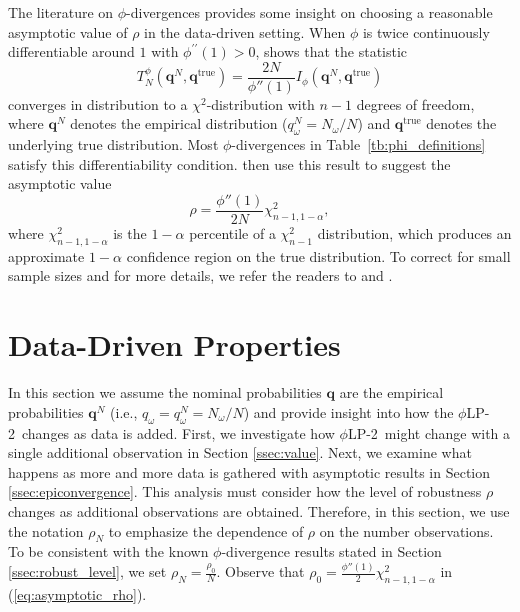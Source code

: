 \documentclass[opre,nonblindrev]{informs3} %
\newcommand{\q}{\mathbf{q}}
\newcommand{\qtrue}{\q^{\text{true}}}
\newcommand{\plp}{$\phi$LP-2}
\begin{document}
The literature on $\phi$-divergences provides some insight on choosing a reasonable asymptotic value of $\rho$ in the data-driven setting. 
When $\phi$ is twice continuously differentiable around $1$ with $\phi^{\prime \prime}(1)>0$, \citet[Theorem 3.1]{pardo2005statistical} shows that the statistic
\[
	T^\phi_N(\q^N,\qtrue) = \frac{2N}{\phi''(1)} I_{\phi}(\q^N, \qtrue)
\]
converges in distribution to a $\chi^2$-distribution with $n-1$ degrees of freedom, where $\q^N$ denotes the empirical distribution ($q^N_\omega = N_\omega/N$) and $\qtrue$ denotes the underlying true distribution.
Most $\phi$-divergences in Table~\ref{tb:phi_definitions} satisfy this differentiability condition.
\citet{bental2013robust} then use this result to suggest the asymptotic value
\begin{equation} \label{eq:asymptotic_rho}
	\rho = \frac{\phi''(1)}{2N} \chi^2_{n-1,1-\alpha},
\end{equation}
where $\chi^2_{n-1,1-\alpha}$ is the $1-\alpha$ percentile of a $\chi^2_{n-1}$ distribution, which produces an approximate $1-\alpha$ confidence region on the true distribution.
To correct for small sample sizes and for more details, we refer the readers to \cite{pardo2005statistical} and \cite{bental2013robust}. 


\section{Data-Driven Properties}
\label{sec:properties}

In this section we assume the nominal probabilities $\q$ are the empirical probabilities $\q^{N}$ (i.e., $q_\omega=q_\omega^N = {N_\omega}/{N}$) and provide insight into how the \plp\ changes as data is added.
First, we investigate how \plp\ might change with a single additional observation in Section \ref{ssec:value}. 
Next, we examine what happens as more and more data is gathered with asymptotic results in Section \ref{ssec:epiconvergence}.
This analysis must consider how the level of robustness $\rho$ changes as additional observations are obtained. 
Therefore, in this section, we use the notation $\rho_N$ to emphasize the dependence of $\rho$ on the number observations.
To be consistent with the known $\phi$-divergence results stated in Section \ref{ssec:robust_level}, we set $\rho_N = \frac{\rho_0}{N}$.
Observe that $\rho_0=\frac{\phi''(1)}{2} \chi^2_{n-1,1-\alpha}$ in (\ref{eq:asymptotic_rho}). 
\end{document}
